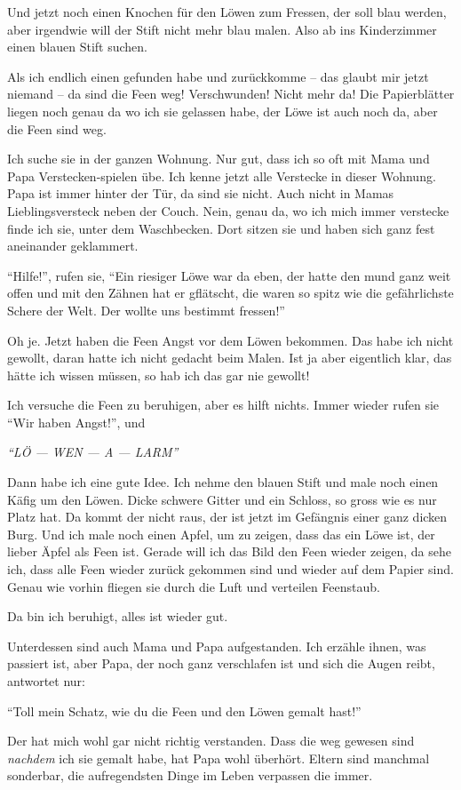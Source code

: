 Und jetzt noch einen Knochen für den Löwen zum Fressen, der soll blau werden, aber irgendwie will der Stift nicht mehr blau malen. Also ab ins Kinderzimmer einen blauen Stift suchen.

Als ich endlich einen gefunden habe und zurückkomme -- das glaubt mir jetzt niemand -- da sind die Feen weg! Verschwunden! Nicht mehr da! Die Papierblätter liegen noch genau da wo ich sie gelassen habe, der Löwe ist auch noch da, aber die Feen sind weg.

Ich suche sie in der ganzen Wohnung. Nur gut, dass ich so oft mit Mama und Papa Verstecken-spielen übe. Ich kenne jetzt alle Verstecke in dieser Wohnung. Papa ist immer hinter der Tür, da sind sie nicht. Auch nicht in Mamas Lieblingsversteck neben der Couch. Nein, genau da, wo ich mich immer verstecke finde ich sie, unter dem Waschbecken. Dort sitzen sie und haben sich ganz fest aneinander geklammert.

\enquote{Hilfe!}, rufen sie, \enquote{Ein riesiger Löwe war da eben, der hatte den mund ganz weit offen und mit den Zähnen hat er gflätscht, die waren so spitz wie die gefährlichste Schere der Welt. Der wollte uns bestimmt fressen!}

Oh je. Jetzt haben die Feen Angst vor dem Löwen bekommen. Das habe ich nicht gewollt, daran hatte ich nicht gedacht beim Malen. Ist ja aber eigentlich klar, das hätte ich wissen müssen, so hab ich das gar nie gewollt! 

Ich versuche die Feen zu beruhigen, aber es hilft nichts. Immer wieder rufen sie \enquote{Wir haben Angst!}, und
\begin{center}
 {\color{red}
\large
\itshape
\enquote{LÖ --- WEN --- A --- LARM}}
\end{center}

Dann habe ich eine gute Idee. Ich nehme den blauen Stift und male noch einen Käfig um den Löwen. Dicke schwere Gitter und ein Schloss, so gross wie es nur Platz hat. Da kommt der nicht raus, der ist jetzt im Gefängnis einer ganz dicken Burg. Und ich male noch einen Apfel, um zu zeigen, dass das ein Löwe ist, der lieber Äpfel als Feen ist. Gerade will ich das Bild den Feen wieder zeigen, da sehe ich, dass alle Feen wieder zurück gekommen sind und wieder auf dem Papier sind. Genau wie vorhin fliegen sie durch die Luft und verteilen Feenstaub. 

Da bin ich beruhigt, alles ist wieder gut.

Unterdessen sind auch Mama und Papa aufgestanden. Ich erzähle ihnen, was passiert ist, aber Papa, der noch ganz verschlafen ist und sich die Augen reibt, antwortet nur: 

\enquote{Toll mein Schatz, wie du die Feen und den Löwen gemalt hast!} 

Der hat mich wohl gar nicht richtig verstanden. Dass die weg gewesen sind \emph{nachdem} ich sie gemalt habe, hat Papa wohl überhört. Eltern sind manchmal sonderbar, die aufregendsten Dinge im Leben verpassen die immer. \hfill {\color{red}\decofourleft}
